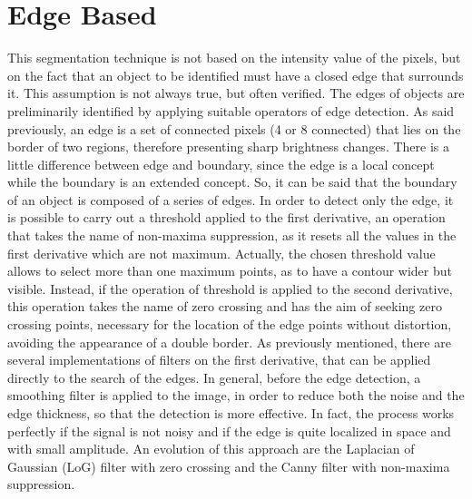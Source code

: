 \documentclass[final,a4paper,12pt,english]{UnicaPhdThesis3}
\begin{document}
	\section{Edge Based} %
	This segmentation technique is not based on the intensity value of the pixels, but on the fact that an object to be identified must have a closed edge that surrounds it. This assumption is not always true, but often verified. The edges of objects are preliminarily identified by applying suitable operators of edge detection. As said previously, an edge is a set of connected pixels (4 or 8 connected) that lies on the border of two regions, therefore presenting sharp brightness changes. There is a little difference between edge and boundary, since the edge is a local concept while the boundary is an extended concept. So, it can be said that the boundary of an object is composed of a series of edges.
	In order to detect only the edge, it is possible to carry out a threshold applied to the first derivative, an operation that takes the name of non-maxima suppression, as it resets all the values ​​in the first derivative which are not maximum. Actually, the chosen threshold value allows to select more than one maximum points, as to have a contour wider but visible. Instead, if the operation of threshold is applied to the second derivative, this operation takes the name of zero crossing and has the aim of seeking zero crossing points, necessary for the location of the edge points without distortion, avoiding the appearance of a double border. As previously mentioned, there are several implementations of filters on the first derivative, that can be applied directly to the search of the edges. In general, before the edge detection, a smoothing filter is applied to the image, in order to reduce both the noise and the edge thickness, so that the detection is more effective. In fact, the process works perfectly if the signal is not noisy and if the edge is quite localized in space and with small amplitude. An evolution of this approach are the Laplacian of Gaussian (\acs{LoG}) filter with zero crossing and the Canny filter with non-maxima suppression.
	
\end{document}
